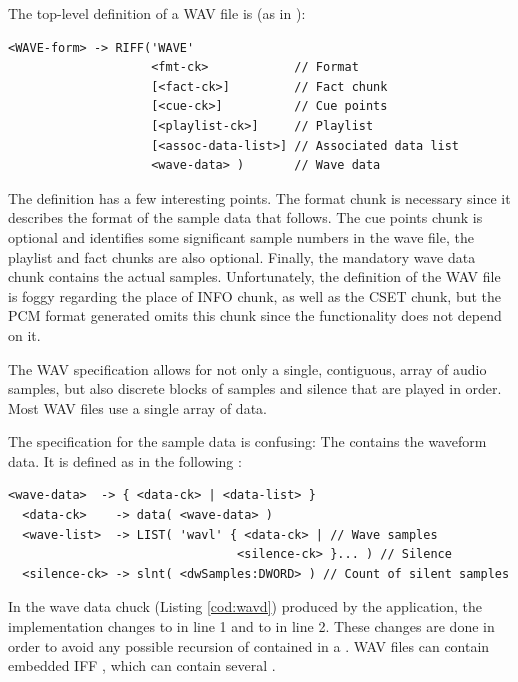 \documentclass[runningheads]{llncs}
\begin{document}
The top-level definition of a WAV file is (as in \cite{wav}):

\begin{lstlisting}[language=Clean,label={cod:riffh},caption={RIFF header},captionpos=b]
<WAVE-form> -> RIFF('WAVE'
                    <fmt-ck>            // Format
                    [<fact-ck>]         // Fact chunk
                    [<cue-ck>]          // Cue points
                    [<playlist-ck>]     // Playlist
                    [<assoc-data-list>] // Associated data list
                    <wave-data> )       // Wave data
\end{lstlisting}

The definition has a few interesting points. The format chunk is necessary since it describes the format of the sample data that follows. The cue points chunk is optional and identifies some significant sample numbers in the wave file, the playlist and fact chunks are also optional. Finally, 
the mandatory wave data chunk contains the actual samples.
Unfortunately, the definition of the WAV file is foggy regarding the place of INFO chunk, as well as the CSET chunk, but the PCM format generated omits this chunk since the functionality does not depend on it. 

The WAV specification allows for not only a single, contiguous, array of audio samples, but also discrete blocks of samples and silence that are played in order. Most WAV files use a single array of data.

The specification for the sample data is confusing:
The  contains the waveform data. It is defined as in the following \cite{wav}:
\begin{lstlisting}[language=Clean,label={cod:wavd},caption={Wave data},captionpos=b]
  <wave-data>  -> { <data-ck> | <data-list> }
  <data-ck>    -> data( <wave-data> )
  <wave-list>  -> LIST( 'wavl' { <data-ck> | // Wave samples
                                <silence-ck> }... ) // Silence
  <silence-ck> -> slnt( <dwSamples:DWORD> ) // Count of silent samples
\end{lstlisting}

In the wave data chuck (Listing \ref{cod:wavd}) produced by the application, the implementation changes  to  in line 1 and  to  in line 2. These changes are done in order to avoid any possible recursion of  contained in a . WAV files can contain embedded IFF , which can contain several .
\end{document}
